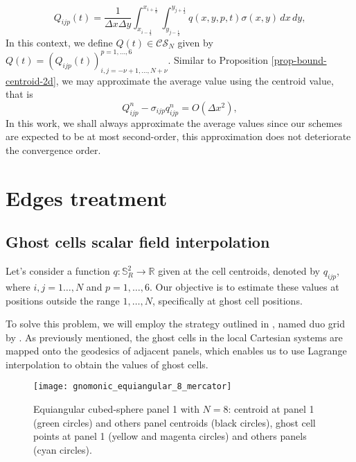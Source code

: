 \begin{equation*}
	Q_{ijp}(t) = \frac{1}{\Delta x \Delta y}\int_{x_{i-\frac{1}{2}}}^{x_{i+\frac{1}{2}}}
	\int_{y_{j-\frac{1}{2}}}^{y_{j+\frac{1}{2}}}  q(x,y,p,t) {\sigma(x,y)}\,dx \,dy,
\end{equation*}
In this context, we define $Q(t) \in \mathcal{CS}_N$ given by 
$Q(t) = (Q_{ijp}(t))_{i,j = -\nu +1, \ldots, N+\nu}^{p=1,\ldots,6}$.
Similar to Proposition \ref{prop-bound-centroid-2d}, we may approximate the average value using the centroid value, that is
\begin{equation*}
	Q_{ijp}^n - \sigma_{ijp}q_{ijp}^n = O(\Delta x ^2), 
\end{equation*}
In this work, we shall always approximate the average values since our schemes are expected to be at most second-order,
this approximation does not deteriorate the convergence order.

\section{Edges treatment}
\label{cs-halodata}
\subsection{Ghost cells scalar field interpolation}
\label{cs-interp}
Let's consider a function $q: \mathbb{S}^2_R \to \mathbb{R}$ given at the cell centroids, 
denoted by $q_{ijp}$, where $i, j=1\ldots, N$ and $p=1,\ldots, 6$. 
Our objective is to estimate these values at positions outside the range $1, \ldots, N$, specifically at ghost cell positions.

To solve this problem, we will employ the strategy outlined in \citet{zerroukat:2022}, 
named duo grid by \citet{chen:2021}.
As previously mentioned, the ghost cells in the local Cartesian systems are mapped onto the geodesics 
of adjacent panels, which enables us to use Lagrange interpolation to obtain the values of ghost cells.
\begin{figure}[!htb]
	\centering
	\texttt{[image: gnomonic\_equiangular\_8\_mercator]}
	\caption{Equiangular cubed-sphere panel 1 with $N=8$: 
	centroid at panel 1 (green circles) and others panel centroids (black circles), 
	ghost cell points at panel 1 (yellow and magenta circles) and others panels (cyan circles).}
	\label{chp4-cs-halodata}
\end{figure}

